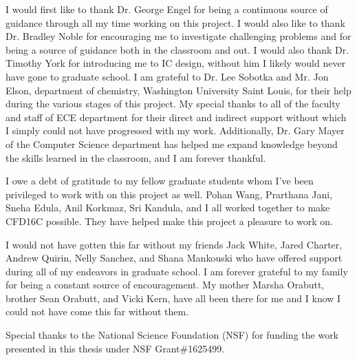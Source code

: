 \documentclass[12pt,oneside,final]{siuethesis}
\theoremstyle{definition}
\begin{document}
\begin{acknowledgements} 

\par I would first like to thank Dr. George Engel for being a continuous source of guidance through all my time working on this project. I would also like to thank Dr. Bradley Noble for encouraging me to investigate challenging problems and for being a source of guidance both in the classroom and out. I would also thank Dr. Timothy York for introducing me to IC design, without him I likely would never have gone to graduate school. I am grateful to  Dr.  Lee  Sobotka  and  Mr.  Jon  Elson,  department  of  chemistry, Washington  University Saint Louis, for their  help  during  the  various  stages  of  this  project. My  special  thanks  to all of the  faculty  and  staff  of  ECE  department  for  their  direct  and indirect support without which I simply could not have progressed with my work. Additionally, Dr. Gary Mayer of the Computer Science department has helped me expand knowledge beyond the skills learned in the classroom, and I am forever thankful. 
\par I owe a debt of gratitude to my fellow graduate students whom I've been privileged to work with on this project as well. Pohan Wang, Prarthana Jani, Sneha Edula, Anil Korkmaz, Sri Kandula, and I all worked together to make CFD16C possible. They have helped make this project a pleasure to work on.
\par I would not have gotten this far without my friends Jack White, Jared Charter, Andrew Quirin, Nelly Sanchez, and Shana Mankouski who have offered support during all of my endeavors in graduate school. I am forever grateful to my family for being a constant source of encouragement. My mother Marsha Orabutt, brother Sean Orabutt, and Vicki Kern, have all been there for me and I know I could not have come this far without them.
\par Special thanks to the National Science Foundation (NSF) for funding the work presented in this thesis under NSF Grant\#1625499.

\end{acknowledgements}

\cleardoublepage
{}
\tableofcontents

\cleardoublepage %
\listoffigures %

\cleardoublepage
{}
\listoftables
\end{document}

